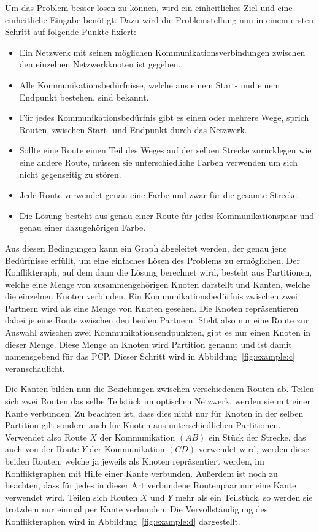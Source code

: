 Um das Problem besser lösen zu können, wird ein einheitliches Ziel und eine einheitliche Eingabe benötigt. Dazu wird die Problemstellung nun in einem ersten Schritt auf folgende Punkte fixiert:
\begin{itemize}
	\item Ein Netzwerk mit seinen möglichen Kommunikationsverbindungen zwischen den einzelnen Netzwerkknoten ist gegeben.
	\item Alle Kommunikationsbedürfnisse, welche aus einem Start- und einem Endpunkt bestehen, sind bekannt.
	\item Für jedes Kommunikationsbedürfnis gibt es einen oder mehrere Wege, sprich Routen, zwischen Start- und Endpunkt durch das Netzwerk.
	\item Sollte eine Route einen Teil des Weges auf der selben Strecke zurücklegen wie eine andere Route, müssen sie unterschiedliche Farben verwenden um sich nicht gegenseitig zu stören.
	\item Jede Route verwendet genau eine Farbe und zwar für die gesamte Strecke.
	\item Die Lösung besteht aus genau einer Route für jedes Kommunikationspaar und genau einer dazugehörigen Farbe.
\end{itemize}

Aus diesen Bedingungen kann ein Graph abgeleitet werden, der genau jene Bedürfnisse erfüllt, um eine einfaches Lösen des Problems zu ermöglichen. Der Konfliktgraph, auf dem dann die Lösung berechnet wird, besteht aus Partitionen, welche eine Menge von zusammengehörigen Knoten darstellt und Kanten, welche die einzelnen Knoten verbinden. Ein Kommunikationsbedürfnis zwischen zwei Partnern wird als eine Menge von Knoten gesehen. Die Knoten repräsentieren dabei je eine Route zwischen den beiden Partnern. Steht also nur eine Route zur Auswahl zwischen zwei Kommunikationsendpunkten, gibt es nur einen Knoten in dieser Menge. Diese Menge an Knoten wird Partition genannt und ist damit namensgebend für das PCP\@. Dieser Schritt wird in Abbildung~\ref{fig:example:c} veranschaulicht.

Die Kanten bilden nun die Beziehungen zwischen verschiedenen Routen ab. Teilen sich zwei Routen das selbe Teilstück im optischen Netzwerk, werden sie mit einer Kante verbunden. Zu beachten ist, dass dies nicht nur für Knoten in der selben Partition gilt sondern auch für Knoten aus unterschiedlichen Partitionen. Verwendet also Route $X$ der Kommunikation $(AB)$ ein Stück der Strecke, das auch von der Route $Y$ der Kommunikation $(CD)$ verwendet wird, werden diese beiden Routen, welche ja jeweils als Knoten repräsentiert werden, im Konfliktgraphen mit Hilfe einer Kante verbunden. Außerdem ist noch zu beachten, dass für jedes in dieser Art verbundene Routenpaar nur eine Kante verwendet wird. Teilen sich Routen $X$ und $Y$ mehr als ein Teilstück, so werden sie trotzdem nur einmal per Kante verbunden. Die Vervollständigung des Konfliktgraphen wird in Abbildung~\ref{fig:example:d} dargestellt.

